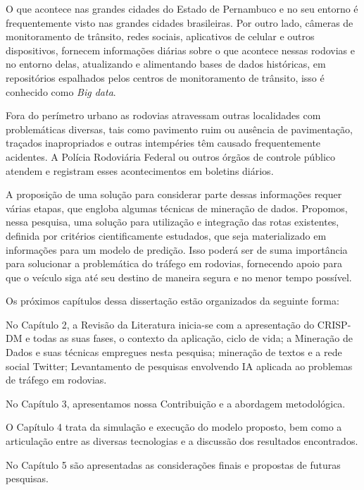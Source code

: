 O que acontece nas grandes cidades do Estado de Pernambuco e no seu entorno é frequentemente visto nas grandes cidades brasileiras.
Por outro lado, câmeras de monitoramento de trânsito, redes sociais, aplicativos de celular e outros dispositivos, fornecem informações diárias sobre o que acontece nessas 
rodovias e no entorno delas, atualizando e alimentando bases de dados históricas, em repositórios espalhados pelos centros de 
monitoramento de trânsito, isso é conhecido como \textit{Big data}.

Fora do perímetro urbano as rodovias atravessam outras localidades com problemáticas diversas, tais como pavimento ruim ou ausência de pavimentação, 
traçados inapropriados e outras intempéries têm causado frequentemente acidentes.
A Polícia Rodoviária Federal ou outros órgãos de controle público atendem e registram esses acontecimentos em boletins diários.

A proposição de uma solução para considerar parte dessas informações requer várias etapas, que engloba algumas técnicas de mineração de dados.
Propomos, nessa pesquisa, uma solução para utilização e integração das rotas existentes, definida por critérios cientificamente estudados, que seja materializado em informações para um modelo de predição.
Isso poderá ser de suma importância para solucionar a problemática do tráfego em rodovias, fornecendo apoio para que o veículo siga até seu destino de maneira segura e no menor tempo possível.

\vspace{5mm}

Os próximos capítulos dessa dissertação estão organizados da seguinte forma:
\vspace{2mm}

No Capítulo 2, a Revisão da Literatura inicia-se com a apresentação do CRISP-DM  e todas as suas fases, o contexto da aplicação, ciclo de vida; a Mineração de Dados e suas técnicas empregues nesta pesquisa; mineração de textos e a rede social Twitter; Levantamento de pesquisas envolvendo IA aplicada ao problemas de tráfego em rodovias.  

No Capítulo 3, apresentamos nossa Contribuição e a abordagem metodológica.

O Capítulo 4 trata da simulação e execução do modelo proposto, bem como a articulação entre as diversas tecnologias e a discussão dos resultados encontrados.

No Capítulo 5 são apresentadas as considerações finais e propostas de futuras pesquisas.



